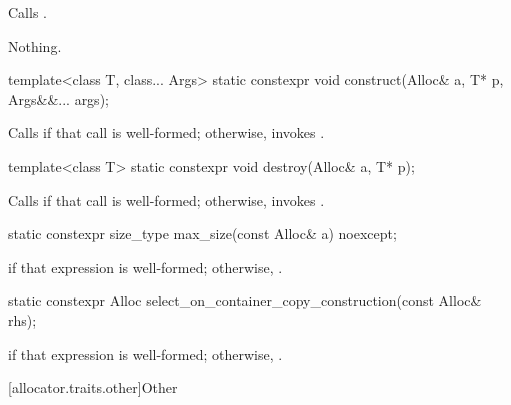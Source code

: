\begin{itemdescr}
\pnum
\effects
Calls .

\pnum
\throws
Nothing.
\end{itemdescr}

%
\begin{itemdecl}
template<class T, class... Args>
  static constexpr void construct(Alloc& a, T* p, Args&&... args);
\end{itemdecl}

\begin{itemdescr}
\pnum
\effects
Calls 
if that call is well-formed;
otherwise, invokes .
\end{itemdescr}

%
\begin{itemdecl}
template<class T>
  static constexpr void destroy(Alloc& a, T* p);
\end{itemdecl}

\begin{itemdescr}
\pnum
\effects
Calls  if that call is well-formed; otherwise, invokes
.
\end{itemdescr}

%
\begin{itemdecl}
static constexpr size_type max_size(const Alloc& a) noexcept;
\end{itemdecl}

\begin{itemdescr}
\pnum
\returns
{} if that expression is well-formed; otherwise,
.
\end{itemdescr}

%
\begin{itemdecl}
static constexpr Alloc select_on_container_copy_construction(const Alloc& rhs);
\end{itemdecl}

\begin{itemdescr}
\pnum
\returns
{} if that expression is
well-formed; otherwise, .
\end{itemdescr}

[allocator.traits.other]{Other}

